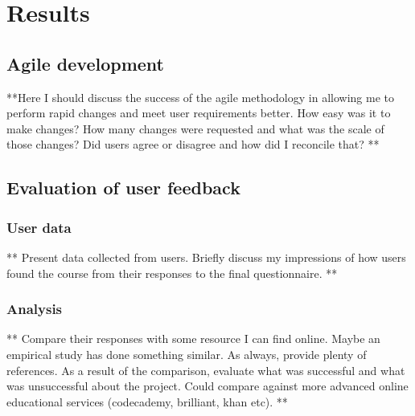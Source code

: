 \chapter{Results}
\label{chapter3}


\section{Agile development}
**Here I should discuss the success of the agile methodology in allowing me to perform rapid changes and meet user requirements better. How easy was it to make changes? How many changes were requested and what was the scale of those changes? Did users agree or disagree and how did I reconcile that? **

\section{Evaluation of user feedback}

\subsection{User data}
** Present data collected from users. Briefly discuss my impressions of how users found the course from their responses to the final questionnaire. **

\subsection{Analysis}
** Compare their responses with some resource I can find online. Maybe an empirical study has done something similar. As always, provide plenty of references. As a result of the comparison, evaluate what was successful and what was unsuccessful about the project. Could compare against more advanced online educational services (codecademy, brilliant, khan etc). ** 
